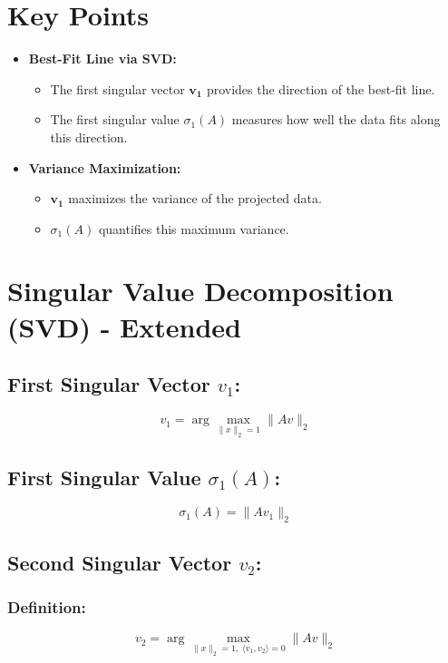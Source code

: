 \documentclass{article}
\begin{document}
\section*{Key Points}

\begin{itemize}
    \item \textbf{Best-Fit Line via SVD:}
    \begin{itemize}
        \item The first singular vector \( \mathbf{v_1} \) provides the direction of the best-fit line.
        \item The first singular value \( \sigma_1(A) \) measures how well the data fits along this direction.
    \end{itemize}
    
    \item \textbf{Variance Maximization:}
    \begin{itemize}
        \item \( \mathbf{v_1} \) maximizes the variance of the projected data.
        \item \( \sigma_1(A) \) quantifies this maximum variance.
    \end{itemize}
\end{itemize}




\section*{Singular Value Decomposition (SVD) - Extended}

\subsection*{First Singular Vector $v_1$:}
\[
v_1 = \arg \max_{\|x\|_2=1} \|Av\|_2
\]

\subsection*{First Singular Value $\sigma_1(A)$:}
\[
\sigma_1(A) = \|Av_1\|_2
\]

\subsection*{Second Singular Vector $v_2$:}
\subsubsection*{Definition:}
\[
v_2 = \arg \max_{\|x\|_2=1,\; \langle v_1,v_2 \rangle=0} \|Av\|_2
\]
\end{document}
